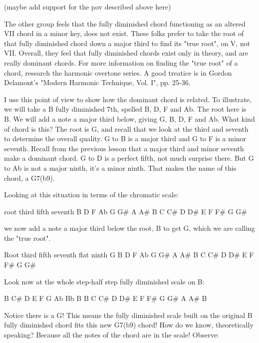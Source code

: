 (maybe add support for the pov described above here)

The other group feels that the fully diminished chord functioning as an
altered VII chord in a minor key, does not exist. These folks prefer to take
the root of that fully diminished chord down a major third to find its "true
root", on V, not VII. Overall, they feel that fully diminished chords exist
only in theory, and are really dominant chords. For more information on
finding the "true root" of a chord, research the harmonic overtone series.
A good treatice is in Gordon Delamont's "Modern Harmonic Technique, Vol. I",
pp. 25-36.

I use this point of view to show how the dominant chord is related. To
illustrate, we will take a B fully diminished 7th, spelled B, D, F and Ab. The
root here is B. We will add a note a major third below, giving G, B, D, F and
Ab. What kind of chord is this? The root is G, and recall that we look at the
third and seventh to determine the overall quality. G to B is a major third and
G to F is a minor seventh. Recall from the previous lesson that a major third
and minor seventh make a dominant chord. G to D is a perfect fifth, not much
surprise there. But G to Ab is not a major ninth, it's a minor ninth. That makes
the name of this chord, a G7(b9).

Looking at this situation in terms of the chromatic scale:

                  root           third          fifth         seventh
                    B              D              F              Ab
G    G\#   A    A\#   B    C    C\#   D    D\#   E    F    F\#   G    G\#

we now add a note a major third below the root, B to get G, which we are
calling the "true root".

Root              third          fifth         seventh        flat ninth
G                   B              D              F              Ab
G    G\#   A    A\#   B    C    C\#   D    D\#   E    F    F\#   G    G\#

Look now at the whole step-half step fully diminished scale on B:

B         C\#   D         E    F         G    Ab        Bb   B
B    C    C\#   D    D\#   E    F    F\#   G    G\#   A    A\#   B

Notice there is a G! This means the fully diminished scale built on the
original B fully diminished chord fits this new G7(b9) chord! How do we
know, theoretically speaking? Because all the notes of the chord are in the
scale! Observe:

